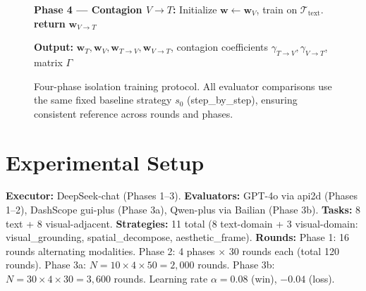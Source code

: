 \documentclass[11pt,a4paper]{article}
\begin{document}
\begin{figure}[H]
{\begin{minipage}{0.92\textwidth}
\noindent \textbf{Phase 4 --- Contagion $V\to T$:} Initialize $\mathbf{w} \leftarrow \mathbf{w}_V$, train on $\mathcal{T}_{\text{text}}$. \textbf{return} $\mathbf{w}_{V\to T}$

\vspace{4pt}
\noindent \textbf{Output:} $\mathbf{w}_T, \mathbf{w}_V, \mathbf{w}_{T\to V}, \mathbf{w}_{V\to T}$, contagion coefficients $\gamma_{T\to V}, \gamma_{V\to T}$, matrix $\Gamma$
\end{minipage}
}
\caption{Four-phase isolation training protocol. All evaluator comparisons use the same fixed baseline strategy $s_0$ (step\_by\_step), ensuring consistent reference across rounds and phases.}
\label{alg:isolation}
\end{figure}

\section{Experimental Setup}

\textbf{Executor:} DeepSeek-chat (Phases 1--3). \textbf{Evaluators:} GPT-4o via api2d (Phases 1--2), DashScope gui-plus (Phase 3a), Qwen-plus via Bailian (Phase 3b). \textbf{Tasks:} 8 text + 8 visual-adjacent. \textbf{Strategies:} 11 total (8 text-domain + 3 visual-domain: visual\_grounding, spatial\_decompose, aesthetic\_frame). \textbf{Rounds:} Phase 1: 16 rounds alternating modalities. Phase 2: 4 phases $\times$ 30 rounds each (total 120 rounds). Phase 3a: $N=10 \times 4 \times 50 = 2,000$ rounds. Phase 3b: $N=30 \times 4 \times 30 = 3,600$ rounds. Learning rate $\alpha=0.08$ (win), $-0.04$ (loss).
\end{document}
